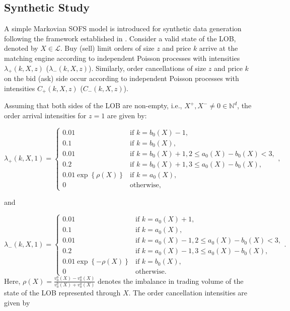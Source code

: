 \documentclass{rQUF2e}
\newcommand{\Bo}{\mathcal{L}}
\theoremstyle{plain}
\theoremstyle{definition}
\theoremstyle{remark}
\begin{document}
\subsection{Synthetic Study}
\label{subsec:synthetic_study}

A simple Markovian SOFS model is introduced for synthetic data generation following the framework established in \citet{cont2023mathematical}. Consider a valid state of the LOB, denoted by $X \in \Bo$. Buy (sell) limit orders of size $z$ and price $k$ arrive at the matching engine according to independent Poisson processes with intensities $\lambda_{+}(k, X, z)$ ($\lambda_{-}(k, X, z)$). Similarly, order cancellations of size $z$ and price $k$ on the bid (ask) side occur according to independent Poisson processes with intensities $C_+(k, X, z)$ ($C_-(k, X, z)$).

Assuming that both sides of the LOB are non-empty, i.e., $X^+, X^- \neq 0 \in \mathbb{N}^d$, the order arrival intensities for $z=1$ are given by:

\[
    \lambda_+(k, X, 1) =
    \begin{cases}
        0.01                               & \text{if } k = b_0(X) - 1,                             \\
        0.1                                & \text{if } k = b_0(X),                                 \\
        0.01                               & \text{if } k = b_0(X) + 1, 2 \leq a_0(X) - b_0(X) < 3, \\
        0.2                                & \text{if } k = b_0(X) + 1, 3 \leq a_0(X) - b_0(X),     \\
        0.01 \exp \left\{ \rho(X) \right\} & \text{if } k = a_0(X),                                 \\
        0                                  & \text{otherwise,}
    \end{cases},
\]

and

\[
    \lambda_-(k, X, 1) =
    \begin{cases}
        0.01                                 & \text{if } k = a_0(X) + 1,                             \\
        0.1                                  & \text{if } k = a_0(X),                                 \\
        0.01                                 & \text{if } k = a_0(X) - 1, 2 \leq a_0(X) - b_0(X) < 3, \\
        0.2                                  & \text{if } k = a_0(X) - 1, 3 \leq a_0(X) - b_0(X),     \\
        0.01 \exp \left\{ - \rho(X) \right\} & \text{if } k = b_0(X),                                 \\
        0                                    & \text{otherwise.}
    \end{cases}.
\]
Here, $\rho(X) = \frac{v^b_0(X) - v^a_0(X)}{v^b_0(X) + v^a_0(X)}$ denotes the imbalance in trading volume of the state of the LOB represented through $X$. The order cancellation intensities are given by
\end{document}

